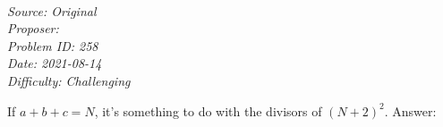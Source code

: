 \SSbreak\\
\emph{Source: Original}\\
\emph{Proposer: \Pnjoy}\\
\emph{Problem ID: 258}\\
\emph{Date: 2021-08-14}\\
\emph{Difficulty: Challenging}\\
\SSbreak

\bigskip

\begin{solution}\hfil\medskip
  
    If $a + b + c = N$, it's something to do with the divisors of $(N + 2)^2$. Answer: \fbox{}
\end{solution}\bigskip
